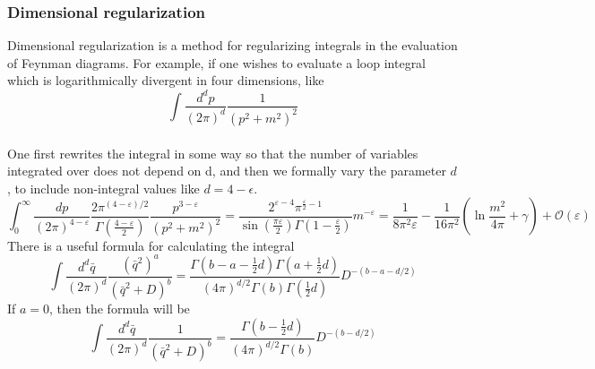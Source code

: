 \documentclass[cyan]{elegantnote}
\begin{document}
\subsubsection{Dimensional regularization}
Dimensional regularization is a method for regularizing integrals in the evaluation of Feynman diagrams. For example, if one wishes to evaluate a loop integral which is logarithmically divergent in four dimensions, like
\[\int {\frac {d^{d}p}{(2\pi )^{d}}}{\frac {1}{\left(p^{2}+m^{2}\right)^{2}}}\]
\\
One first rewrites the integral in some way so that the number of variables integrated over does not depend on d, and then we formally vary the parameter $d$, to include non-integral values like $d=4-\epsilon$.
\[\int _{0}^{\infty }{\frac {dp}{(2\pi )^{4-\varepsilon }}}{\frac {2\pi ^{(4-\varepsilon )/2}}{\Gamma \left({\frac {4-\varepsilon }{2}}\right)}}{\frac {p^{3-\varepsilon }}{\left(p^{2}+m^{2}\right)^{2}}}={\frac {2^{\varepsilon -4}\pi ^{{\frac {\varepsilon }{2}}-1}}{\sin({\frac {\pi \varepsilon }{2}})\Gamma (1-{\frac {\varepsilon }{2}})}}m^{-\varepsilon }={\frac {1}{8\pi ^{2}\varepsilon }}-{\frac {1}{16\pi ^{2}}}\left(\ln {\frac {m^{2}}{4\pi }}+\gamma \right)+{\mathcal {O}}(\varepsilon )\]
There is a useful formula for calculating the integral
\[\int \frac{d^d \bar{q}}{(2\pi)^{d}} \frac{(\bar{q}^2)^a}{(\bar{q}^2+D)^b} = \frac{\Gamma(b-a-\frac{1}{2}d) \Gamma(a+\frac{1}{2}d)}{(4\pi)^{d/2} \Gamma(b) \Gamma(\frac{1}{2}d)} D^{-(b-a-d/2)}\]
If $a=0$, then the formula will be
\[\int \frac{d^d \bar{q}}{(2\pi)^{d}} \frac{1}{(\bar{q}^2+D)^b} = \frac{\Gamma(b-\frac{1}{2}d)}{(4\pi)^{d/2} \Gamma(b)} D^{-(b-d/2)}\]
\end{document}
